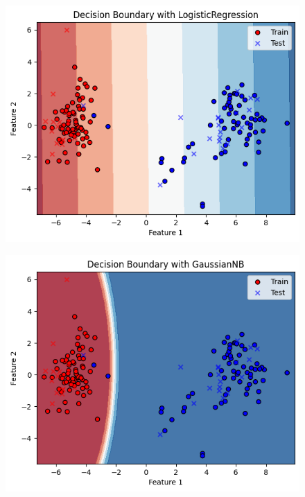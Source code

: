 \documentclass[12pt]{article}
\begin{document}
\begin{enumerate}
	\begin{figure}[H]
        \centering
        \includegraphics[width=\textwidth]{images/LR graph.png}
    \end{figure}
	\begin{figure}[H]
        \centering
        \includegraphics[width=\textwidth]{images/nb_graph.png}
    \end{figure}
	
\end{enumerate}

\printbibliography
\end{document}
